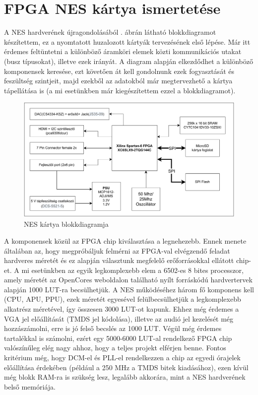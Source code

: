 \chapter{FPGA NES kártya ismertetése}
\label{sec:fpga-nes-board-summary}

A NES hardverének újragondolásából . ábrán látható blokkdiagramot készítettem, ez a nyomtatott huzalozott kártyák tervezésének első lépése. Már itt érdemes feltüntetni a különböző áramköri elemek közti kommunikációs utakat (busz típusokat), illetve ezek irányát. A diagram alapján elkezdődhet a különböző komponensek keresése, ezt követően át kell gondolnunk ezek fogyasztását és feszültség szintjeit, majd ezekből az adatokból már megtervezhető a kártya tápellátása is (a mi esetünkben már kiegészítettem ezzel a blokkdiagramot). 

\begin{figure}[H]
	\centering
	\includegraphics[width=150mm, keepaspectratio]{figures/NES-board-blockdiagram}
	\caption{NES kártya blokkdiagramja}
	\label{fig:PCB-blockdiagram}
\end{figure}

A komponensek közül az FPGA chip kiválasztása a legnehezebb. Ennek menete általában az, hogy megpróbáljuk felmérni az FPGA-val elvégzendő feladat hardveres méretét és ez alapján választunk megfelelő erőforrásokkal ellátott chip-et. A mi esetünkben az egyik legkomplexebb elem a 6502-es 8 bites processzor, amely méretét az OpenCores weboldalon \cite{OpenCore} található nyílt forráskódú hardvertervek alapján 1000 LUT-ra becsülhetjük. A NES működéséhez három fő komponens kell (CPU, APU, PPU), ezek méretét egyesével felülbecsülhetjük a legkomplexebb alkatrész méretével, így összesen 3000 LUT-ot kapunk. Ehhez még érdemes a VGA jel előállítását (TMDS jel kódolása), illetve az audió jel kezelését még hozzászámolni, erre is jó felső becslés az 1000 LUT. Végül még érdemes tartalékkal is számolni, ezért egy 5000-6000 LUT-al rendelkező FPGA chip valószínűleg elég nagy ahhoz, hogy a teljes projekt elférjen benne. Fontos kritérium még, hogy DCM-el és PLL-el rendelkezzen a chip az egyedi órajelek előállítása érdekében (például a 250 MHz a TMDS bitek kiadásához), ezen kívül még blokk RAM-ra is szükség lesz, legalább akkorára, mint a NES hardverének belső memóriája.  

